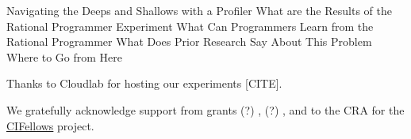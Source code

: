 \documentclass[acmsmall,review,anonymous]{acmart}
\begin{document}
   {Navigating the Deeps and Shallows with a Profiler}
     {What are the Results of the Rational Programmer Experiment}
  {What Can Programmers Learn from the Rational Programmer}
     {What Does Prior Research Say About This Problem}
  {Where to Go from Here}


\begin{acks}
  Thanks to Cloudlab for hosting our experiments [CITE].

We gratefully acknowledge support from
 grants
  (?) \href{"https://www.nsf.gov/awardsearch/showAward?AWD_ID=1763922"}{},
  (?) \href{"https://www.nsf.gov/awardsearch/showAward?AWD_ID=1823244"}{},
 and
 \href{"https://www.nsf.gov/awardsearch/showAward?AWD_ID=2030859"}{}
  to the CRA for the \href{https://cifellows2020.org}{CIFellows} project.
\end{acks}



\end{document}

